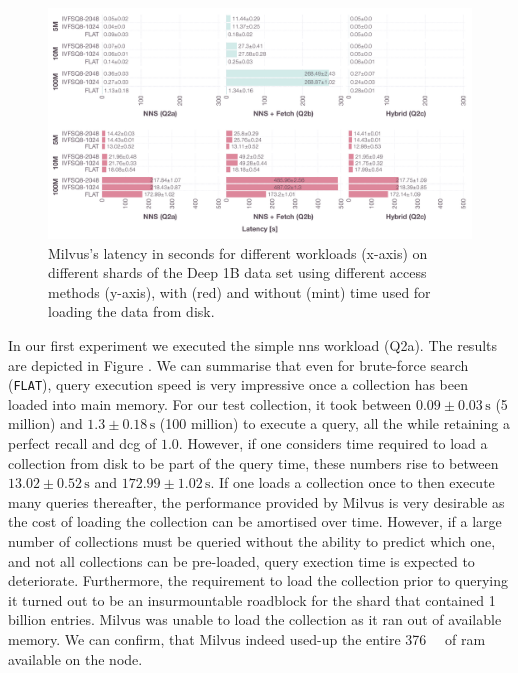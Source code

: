 \begin{landscape}
    \begin{figure}[p]
        \includegraphics[width=1.6\textwidth]{figures/bignns/milvus/bignns-milvus}
        \caption{Milvus's latency in seconds for different workloads (x-axis) on different shards of the Deep 1B data set using different access methods (y-axis), with (red) and without (mint) time used for loading the data from disk.}
        \label{figure:milvus_runtime}
    \end{figure}
\end{landscape}

In our first experiment we executed the simple \acrshort{nns} workload (Q2a). The results are depicted in Figure . We can summarise that even for brute-force search (\texttt{FLAT}), query execution speed is very impressive once a collection has been loaded into main memory. For our test collection, it took between $0.09 \pm 0.03 \, \si{\second}$ (5 million) and $1.3 \pm 0.18 \, \si{\second}$ (100 million) to execute a query, all the while retaining a perfect recall and \acrshort{dcg} of $1.0$. However, if one considers time required to load a collection from disk to be part of the query time, these numbers rise to between $13.02 \pm 0.52 \, \si{\second}$ and $172.99 \pm 1.02 \, \si{\second}$. If one loads a collection once to then execute many queries thereafter, the performance provided by Milvus is very desirable as the cost of loading the collection can be amortised over time. However, if a large number of collections must be queried without the ability to predict which one, and not all collections can be pre-loaded, query exection time is expected to deteriorate. Furthermore, the requirement to load the collection prior to querying it turned out to be an insurmountable roadblock for the shard that contained 1 billion entries. Milvus was unable to load the collection as it ran out of available memory. We can confirm, that Milvus indeed used-up the entire \SI{376}{\giga\byte} of \acrshort{ram} available on the node.

